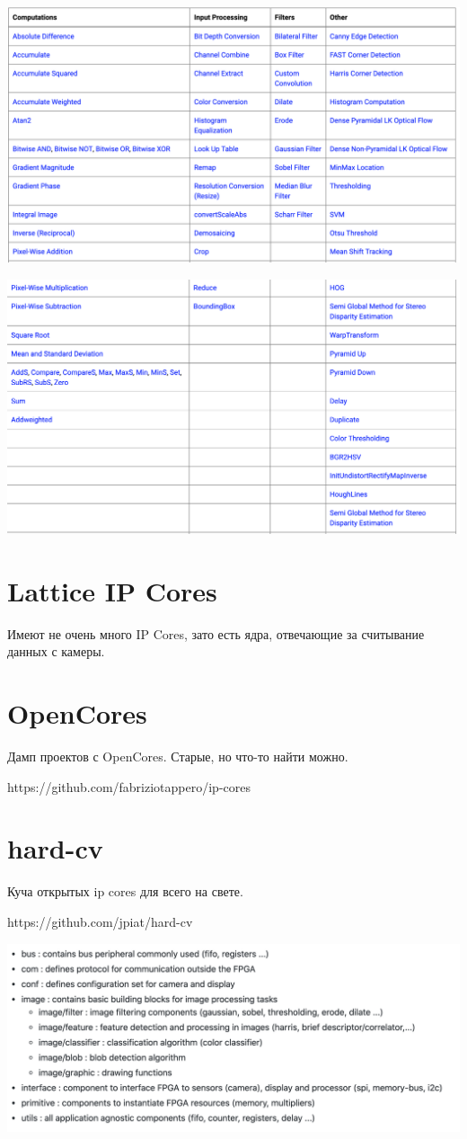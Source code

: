 \documentclass[12pt]{article}
\begin{document}
\includegraphics[scale=0.2]{img/xfopencv2.png}

\includegraphics[scale=0.2]{img/xfopencv1.png}


\section{Lattice IP Cores}
Имеют не очень много IP Cores, зато есть ядра, отвечающие за 
считывание данных с камеры.


\section{OpenCores}

Дамп проектов с OpenCores. Старые, но что-то найти можно.

https://github.com/fabriziotappero/ip-cores


\section{hard-cv}
Куча открытых ip cores для всего на свете.

https://github.com/jpiat/hard-cv


\includegraphics*[scale=.25]{img/hardcv.png}
\end{document}
